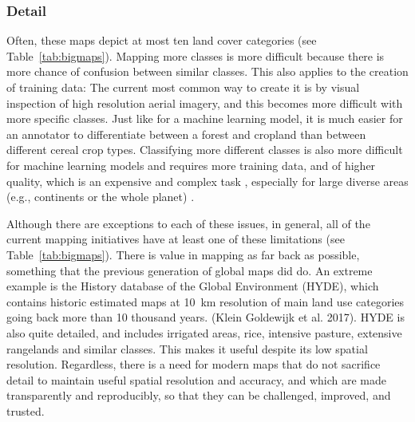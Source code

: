     \subsubsection{Detail}
        Often, these maps depict at most ten land cover categories (see Table~\ref{tab:bigmaps}). Mapping more classes is more difficult because there is more chance of confusion between similar classes. This also applies to the creation of training data: The current most common way to create it is by visual inspection of high resolution aerial imagery, and this becomes more difficult with more specific classes. Just like for a machine learning model, it is much easier for an annotator to differentiate between a forest and cropland than between different cereal crop types. Classifying more different classes is also more difficult for machine learning models and requires more training data, and of higher quality, which is an expensive and complex task \citep{li2021improving}, especially for large diverse areas (e.g., continents or the whole planet) \citep{tsendbazar2021towards,stanimirova2023global}. 

    Although there are exceptions to each of these issues, in general, all of the current mapping initiatives have at least one of these limitations (see Table\@~\ref{tab:bigmaps}). There is value in mapping as far back as possible, something that the previous generation of global maps did do. An extreme example is the History database of the Global Environment (HYDE), which contains historic estimated maps at 10~km resolution of main land use categories going back more than 10 thousand years. (Klein Goldewijk et al. 2017). HYDE is also quite detailed, and includes irrigated areas, rice, intensive pasture, extensive rangelands and similar classes. This makes it useful despite its low spatial resolution. Regardless, there is a need for modern maps that do not sacrifice detail to maintain useful spatial resolution and accuracy, and which are made transparently and reproducibly, so that they can be challenged, improved, and trusted.


